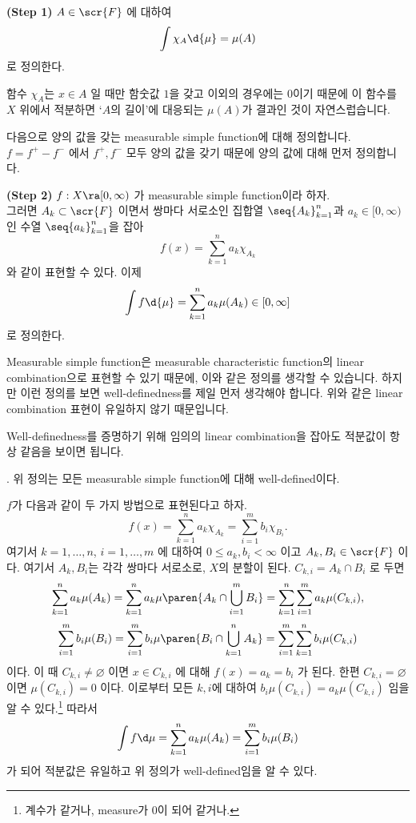 \textbf{\sffamily (Step 1)} \(A \in \scr{F}\) 에 대하여
\[
    \int \chi_A \d{\mu} = \mu(A)
\]
로 정의한다.

함수 \(\chi_A\)는 \(x \in A\) 일 때만 함숫값 \(1\)을 갖고 이외의 경우에는 \(0\)이기 때문에 이 함수를 \(X\) 위에서 적분하면 `\(A\)의 길이'에 대응되는 \(\mu(A)\)가 결과인 것이 자연스럽습니다.

다음으로 양의 값을 갖는 measurable simple function에 대해 정의합니다. \(f = f^+ - f^-\) 에서 \(f^+, f^-\) 모두 양의 값을 갖기 때문에 양의 값에 대해 먼저 정의합니다.

\textbf{\sffamily (Step 2)} \(f: X \ra [0, \infty)\) 가 measurable simple function이라 하자. \\
그러면 \(A_k \subset \scr{F}\) 이면서 쌍마다 서로소인 집합열 \(\seq{A_k}_{k=1}^n\)과 \(a_k \in [0, \infty)\) 인 수열 \(\seq{a_k}_{k=1}^n\)을 잡아
\[
    f(x) = \sum_{k=1}^n a_k \chi_{A_k}
\]
와 같이 표현할 수 있다. 이제
\[
    \int f\d{\mu} = \sum_{k=1}^n a_k \mu(A_k) \in [0, \infty]
\]
로 정의한다.

Measurable simple function은 measurable characteristic function의 linear combination으로 표현할 수 있기 때문에, 이와 같은 정의를 생각할 수 있습니다. 하지만 이런 정의를 보면 well-definedness를 제일 먼저 생각해야 합니다. 위와 같은 linear combination 표현이 유일하지 않기 때문입니다.

Well-definedness를 증명하기 위해 임의의 linear combination을 잡아도 적분값이 항상 같음을 보이면 됩니다.

\prop. 위 정의는 모든 measurable simple function에 대해 well-defined이다.

\pf \(f\)가 다음과 같이 두 가지 방법으로 표현된다고 하자.
\[
    f(x) = \sum_{k=1}^n a_k \chi_{A_k} = \sum_{i=1}^m b_i \chi_{B_i}.
\]
여기서 \(k = 1, \dots, n\), \(i = 1, \dots, m\) 에 대하여 \(0\leq a_k, b_i < \infty\) 이고 \(A_k, B_i \in \scr{F}\) 이다. 여기서 \(A_k, B_i\)는 각각 쌍마다 서로소로, \(X\)의 분할이 된다. \(C_{k, i} = A_k \cap B_i\) 로 두면
\[
    \sum_{k=1}^n a_k \mu(A_k) = \sum_{k=1}^n a_k \mu\paren{A_k \cap \bigcup_{i=1}^m B_i} = \sum_{k=1}^n \sum_{i=1}^m a_k \mu(C_{k, i}),
\]
\[
    \sum_{i=1}^m b_i \mu(B_i) = \sum_{i=1}^{m} b_i \mu\paren{B_i \cap \bigcup_{k=1}^n A_k}= \sum_{i=1}^m \sum_{k=1}^n b_i \mu(C_{k, i})
\]
이다. 이 때 \(C_{k, i} \neq \varnothing\) 이면 \(x \in C_{k, i}\) 에 대해 \(f(x) = a_k = b_i\) 가 된다. 한편 \(C_{k, i} = \varnothing\) 이면 \(\mu(C_{k, i}) = 0\) 이다. 이로부터 모든 \(k, i\)에 대하여 \(b_i \mu(C_{k, i}) = a_k \mu(C_{k, i})\) 임을 알 수 있다.\footnote{계수가 같거나, measure가 0이 되어 같거나.} 따라서
\[
    \int f \d\mu = \sum_{k=1}^n a_k \mu(A_k) = \sum_{i=1}^m b_i \mu(B_i)
\]
가 되어 적분값은 유일하고 위 정의가 well-defined임을 알 수 있다.


